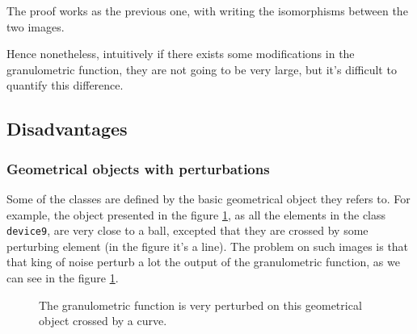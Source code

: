 
The proof works as the previous one, with writing the isomorphisms between the two images.

Hence nonetheless, intuitively if there exists some modifications in the granulometric function, they are not going to be very large, but it's difficult to quantify this difference.

\subsection{Disadvantages}

\subsubsection{Geometrical objects with perturbations}

Some of the classes are defined by the basic geometrical object they refers to. For example, the object presented in the figure \ref{device9-6}, as all the elements in the class \texttt{device9}, are very close to a ball, excepted that they are crossed by some perturbing element (in the figure it's a line). The problem on such images is that that king of noise perturb a lot the output of the granulometric function, as we can see in the figure \ref{device9-6}.

\begin{figure}[!ht]
    \centering
    \qquad\qquad\qquad
    \caption{The granulometric function is very perturbed on this geometrical object crossed by a curve.}
	\label{device9-6}
\end{figure}

